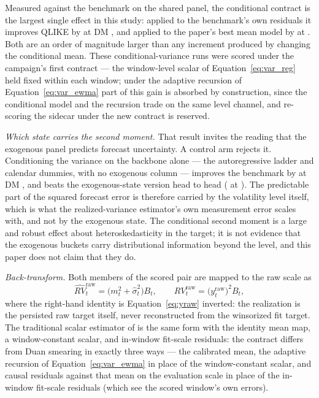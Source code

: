 Measured against the benchmark on the shared panel, the conditional
contract is the largest single effect in this study: applied to the
benchmark's own residuals it improves QLIKE by
\unifIncrCondVarBenchDQ{} at DM \unifIncrCondVarBenchDM{}, and applied
to the paper's best mean model by \unifIncrCondVarChampDQ{} at
\unifIncrCondVarChampDM{}. Both are an order of magnitude larger than
any increment produced by changing the conditional mean. These
conditional-variance runs were scored under the campaign's first
contract --- the window-level scalar of Equation~\eqref{eq:var_reg}
held fixed within each window; under the adaptive recursion of
Equation~\eqref{eq:var_ewma} part of this gain is absorbed by
construction, since the conditional model and the recursion trade on
the same level channel, and re-scoring the sidecar under the new
contract is reserved.

\emph{Which state carries the second moment.} That result invites the
reading that the exogenous panel predicts forecast uncertainty. A
control arm rejects it. Conditioning the variance on the backbone alone
--- the autoregressive ladder and calendar dummies, with no exogenous
column --- improves the benchmark by \unifIncrCondVarBenchLevelDQ{} at
DM \unifIncrCondVarBenchLevelDM{}, and beats the exogenous-state
version head to head
(\unifIncrCondVarBenchLevelVsCondVarBenchDQ{} at
\unifIncrCondVarBenchLevelVsCondVarBenchDM{}). The predictable part of
the squared forecast error is therefore carried by the volatility level
itself, which is what the realized-variance estimator's own measurement
error scales with, and not by the exogenous state. The conditional
second moment is a large and robust effect about heteroskedasticity in
the target; it is not evidence that the exogenous buckets carry
distributional information beyond the level, and this paper does not
claim that they do.

\emph{Back-transform.} Both members of the scored pair are mapped to the
raw scale as
\begin{equation}
    \widehat{RV}_t^{\mathrm{raw}}
    = \bigl(m_t^2 + \hat{\sigma}^2_t\bigr) B_t,
    \qquad
    RV_t^{\mathrm{raw}} = \bigl(y^{\mathrm{raw}}_t\bigr)^2 B_t,
    \label{eq:smear_map}
\end{equation}
where the right-hand identity is Equation~\eqref{eq:yraw} inverted: the
realization is the persisted raw target itself, never reconstructed from
the winsorized fit target. The traditional scalar estimator of
\citet{Duan1983} is the same form with the identity mean map, a
window-constant scalar, and in-window fit-scale residuals: the contract
differs from Duan smearing in exactly three ways --- the calibrated
mean, the adaptive recursion of Equation~\eqref{eq:var_ewma} in place
of the window-constant scalar, and causal residuals against that mean
on the evaluation scale in place of the in-window fit-scale residuals
(which see the scored window's own errors).

